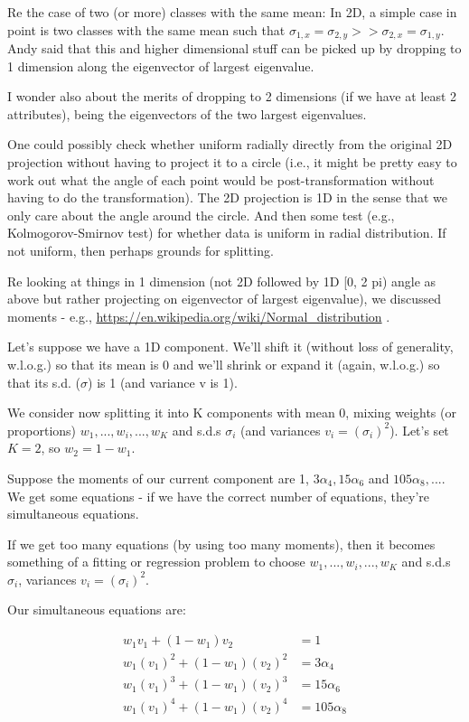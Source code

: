 \documentclass{elsarticle}
\begin{document}
Re the case of two (or more) classes with the same mean:
In 2D, a simple case in point is two classes with the same mean
such that $\sigma_{1, x} = \sigma_{2, y} >> \sigma_{2, x} = \sigma_{1, y}$.
Andy said that this and higher dimensional stuff can be picked up
by dropping to 1 dimension along the eigenvector of largest eigenvalue.


I wonder also about the merits of dropping to 2 dimensions (if we have at least 2 attributes), being the eigenvectors of the two largest eigenvalues. 

One could possibly check whether uniform radially directly from the original 2D projection without having to project it to a circle (i.e., it might be pretty easy to work out what the angle of each point would be post-transformation without having to do the transformation).  The 2D projection is 1D in the sense that we only care about the angle around the circle.  And then some test (e.g., Kolmogorov-Smirnov test) for whether data is uniform in radial distribution.  If not uniform, then perhaps grounds for splitting.

Re looking at things in 1 dimension (not 2D followed by 1D [0, 2 pi) angle
as above but rather projecting on eigenvector of largest eigenvalue), we
discussed moments - e.g., \url{https://en.wikipedia.org/wiki/Normal_distribution} .


Let's suppose we have a 1D component.  We'll shift it (without loss of
generality, w.l.o.g.) so that its mean is 0 and we'll shrink or expand it
(again, w.l.o.g.) so that its s.d. ($\sigma$) is 1 (and variance v is 1).

We consider now splitting it into K components with mean 0,
mixing weights (or proportions) $w_1, ..., w_i, ..., w_K$ and s.d.s $\sigma_i$ (and variances $v_i = (\sigma_i)^2$).
Let's set $K = 2$, so $w_2 = 1 - w_1$.

Suppose the moments of our current component are 1, $3 \alpha_4, 15 \alpha_6$ and $105 \alpha_8, ... $.
We get some equations - if we have the correct number of equations,
they're simultaneous equations.

If we get too many equations (by using too many moments), then it
becomes something of a fitting or regression problem to choose
$w_1, ..., w_i, ..., w_K$ and s.d.s $\sigma_i$, variances $v_i = (\sigma_i)^2$.

Our simultaneous equations are:

\begin{align*}
w_1 v_1       + (1 - w_1) v_2       &=    1\\
w_1 (v_1)^2  + (1 - w_1) (v_2)^2  &=    3 \alpha_4\\
w_1 (v_1)^3  + (1 - w_1) (v_2)^3  &=   15 \alpha_6\\
w_1 (v_1)^4  + (1 - w_1) (v_2)^4  &=  105 \alpha_8
\end{align*}
\end{document}
